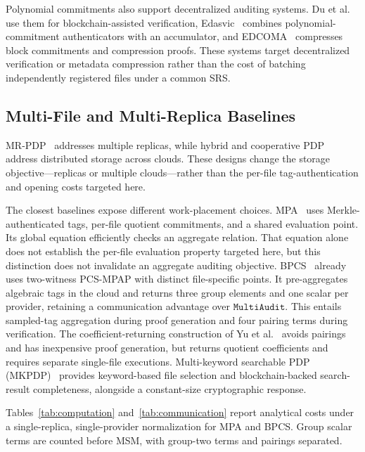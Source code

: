 \documentclass[lettersize,journal]{IEEEtran}
\newcommand{\MultiAudit}{\ensuremath{\mathtt{MultiAudit}}}
\begin{document}
Polynomial commitments also support decentralized auditing systems. Du et al.~\cite{Du22TDSC} use them for blockchain-assisted verification, Edasvic~\cite{Yu2024Edasvic} combines polynomial-commitment authenticators with an accumulator, and EDCOMA~\cite{Yu2024EDCOMA} compresses block commitments and compression proofs. These systems target decentralized verification or metadata compression rather than the cost of batching independently registered files under a common SRS.

\subsection{Multi-File and Multi-Replica Baselines}
MR-PDP~\cite{Curtmola2008MRPDP} addresses multiple replicas, while hybrid and cooperative PDP~\cite{Zhu2010Hybrid,Zhu2012Cooperative} address distributed storage across clouds. These designs change the storage objective---replicas or multiple clouds---rather than the per-file tag-authentication and opening costs targeted here.

The closest baselines expose different work-placement choices. MPA~\cite{XuTIFS26} uses Merkle-authenticated tags, per-file quotient commitments, and a shared evaluation point. Its global equation efficiently checks an aggregate relation. That equation alone does not establish the per-file evaluation property targeted here, but this distinction does not invalidate an aggregate auditing objective. BPCS~\cite{ZhangTPDS23} already uses two-witness PCS-MPAP with distinct file-specific points. It pre-aggregates algebraic tags in the cloud and returns three group elements and one scalar per provider, retaining a communication advantage over \MultiAudit{}. This entails sampled-tag aggregation during proof generation and four pairing terms during verification. The coefficient-returning construction of Yu et al.~\cite{YuTC25} avoids pairings and has inexpensive proof generation, but returns quotient coefficients and requires separate single-file executions. Multi-keyword searchable PDP (MKPDP)~\cite{MiaoSCIS2026} provides keyword-based file selection and blockchain-backed search-result completeness, alongside a constant-size cryptographic response.

Tables~\ref{tab:computation} and~\ref{tab:communication} report analytical costs under a single-replica, single-provider normalization for MPA and BPCS. Group scalar terms are counted before MSM, with group-two terms and pairings separated.
\end{document}
